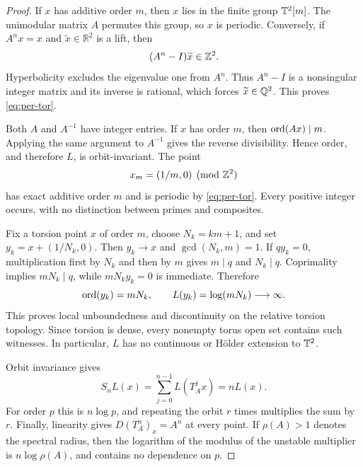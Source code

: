 \documentclass[11pt]{article}
\theoremstyle{definition}
\theoremstyle{remark}
\begin{document}
\begin{proof}
If \(x\) has additive order \(m\), then \(x\) lies in the finite group
\(\mathbb{T}^{2}[m]\).  The unimodular matrix \(A\) permutes this group, so \(x\)
is periodic.  Conversely, if \(A^nx=x\) and \(\widetilde x\in\mathbb R^2\)
is a lift, then
\begin{equation}
  (A^n-I)\widetilde x\in\mathbb{Z}^2.
\end{equation}
Hyperbolicity excludes the eigenvalue one from \(A^n\).  Thus
\(A^n-I\) is a nonsingular integer matrix and its inverse is rational,
which forces \(\widetilde x\in\mathbb{Q}^2\).  This proves \eqref{eq:per-tor}.

Both \(A\) and \(A^{-1}\) have integer entries.  If \(x\) has order
\(m\), then \(\operatorname{ord}(Ax)\mid m\).  Applying the same argument to \(A^{-1}\)
gives the reverse divisibility.  Hence order, and therefore \(L\), is
orbit-invariant.  The point
\begin{equation}
  x_m=(1/m,0)\pmod{\mathbb{Z}^2}
\end{equation}
has exact additive order \(m\) and is periodic by \eqref{eq:per-tor}.
Every positive integer occurs, with no distinction between primes and
composites.

Fix a torsion point \(x\) of order \(m\), choose
\(N_k=km+1\), and set \(y_k=x+(1/N_k,0)\).  Then \(y_k\to x\) and
\(\gcd(N_k,m)=1\).  If \(qy_k=0\), multiplication first by \(N_k\) and
then by \(m\) gives \(m\mid q\) and \(N_k\mid q\).  Coprimality implies
\(mN_k\mid q\), while \(mN_k y_k=0\) is immediate.  Therefore
\begin{equation}
  \operatorname{ord}(y_k)=mN_k,\qquad L(y_k)=\log(mN_k)\longrightarrow\infty.
  \label{eq:clock-unbounded}
\end{equation}
This proves local unboundedness and discontinuity on the relative torsion
topology.  Since torsion is dense, every nonempty torus open set contains
such witnesses.  In particular, \(L\) has no continuous or H\"older
extension to \(\mathbb{T}^{2}\).

Orbit invariance gives
\begin{equation}
  S_nL(x)=\sum_{j=0}^{n-1}L(T_A^jx)=nL(x).
\end{equation}
For order \(p\) this is \(n\log p\), and repeating the orbit \(r\) times
multiplies the sum by \(r\).  Finally, linearity gives
\(D(T_A^n)_x=A^n\) at every point.  If \(\rho(A)>1\) denotes the spectral
radius, then the logarithm of the modulus of the unstable multiplier is
\(n\log\rho(A)\), and contains no dependence on \(p\).
\end{proof}
\end{document}
